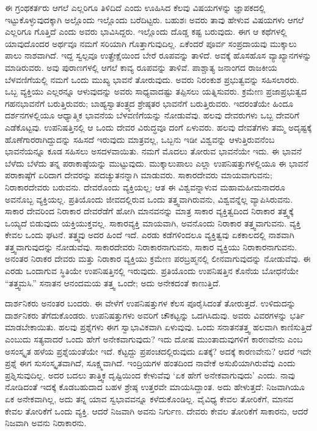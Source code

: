 \vskip 0.2cm 

ಈ ಗ್ರಂಥಕರ್ತರು ಆಗಲೆ ಎಲ್ಲರಿಗೂ ತಿಳಿದಿದೆ ಎಂದು ಊಹಿಸಿದ ಕೆಲವು ವಿಷಯಗಳನ್ನು ಜ್ಞಾಪಕದಲ್ಲಿ ಇಟ್ಟುಕೊಳ್ಳುವುದಕ್ಕಾಗಿ ಅಲ್ಲೊಂದು ಇಲ್ಲೊಂದು ಬರೆದಿಟ್ಟರು. ಬಹುಶಃ ಅವರು ತಾವು ಹೇಳುವ ವಿಷಯಗಳು ಆಗಲೆ ಎಲ್ಲರಿಗೂ ಗೊತ್ತಿದೆ ಎಂದು ಅವರು ಭಾವಿಸಿದ್ದರು. ಇಲ್ಲೊಂದು ದೊಡ್ಡ ಕಷ್ಟ ಬರುವುದು. ಈಗ ಆ ಕಥೆಗಳಲ್ಲಿ ಯಾವುದೊಂದರ ಅರ್ಥವೂ ನಮಗೆ ಸರಿಯಾಗಿ ಗೊತ್ತಾಗುವುದಿಲ್ಲ. ಏಕೆಂದರೆ ಪೂರ್ವ ಸಂಪ್ರದಾಯವು ಮುಕ್ಕಾಲು ಪಾಲು ನಾಶವಾಗಿದೆ. ಇದ್ದ ಸ್ವಲ್ಪವೂ ಉತ್ಪ್ರೇಕ್ಷೆಯಿಂದ ಬೇರೆ ರೂಪವನ್ನು ತಾಳಿದೆ. ಅವಕ್ಕೆ ಹೊಸಹೊಸ ವ್ಯಾಖ್ಯಾನಗಳನ್ನು ಮಾಡಿರುವರು. ಅವು ಪುರಾಣಗಳಲ್ಲಿ ಆಗಲೆ ಕಾವ್ಯ ರೂಪವನ್ನು ತಾಳಿವೆ. ಪಾಶ್ಚಾತ್ಯ ಜನಾಂಗದ ರಾಜಕೀಯ ಬೆಳವಣಿಗೆಯಲ್ಲಿ ನಮಗೆ ಒಂದು ಮುಖ್ಯ ಭಾವನೆ ತೋರುವುದು. ಅವರು ನಿರಂಕುಶ ಪ್ರಭುತ್ವವನ್ನು ಸಹಿಸಲಾರರು. ಒಬ್ಬ ವ್ಯಕ್ತಿಯು ಎಲ್ಲರನ್ನೂ ಆಳುವುದನ್ನು ಅವರು ಸಾಧ್ಯವಾದಷ್ಟು ತಪ್ಪಿಸಲು ಯತ್ನಿಸುವರು. ಕ್ರಮೇಣ ಪ್ರಜಾಪ್ರಭುತ್ವದ ಗಹನಭಾವನೆಗೆ ಬರುತ್ತಿರುವರು; ಬಾಹ್ಯಸ್ವಾತಂತ್ರ್ಯದ ಶ್ರೇಷ್ಠತರ ಭಾವನೆಗೆ ಬರುತ್ತಿರುವರು. ಇದರಂತೆಯೇ ಹಿಂದೂ ದರ್ಶನಗಳಲ್ಲಿಯೂ ಆಧ್ಯಾತ್ಮಿಕ ಭಾವನೆಯ ಬೆಳವಣಿಗೆಯನ್ನು ನೋಡುವೆವು. ಹಲವು ದೇವರುಗಳು ಒಬ್ಬ ದೇವರಿಗೆ ಎಡೆಕೊಟ್ಟವು. ಉಪನಿಷತ್ತಿನಲ್ಲಿ ಆ ಒಂದು ದೇವರ ವಿರುದ್ಧವೂ ದಂಗೆ ಏಳುವರು. ಹಲವು ದೇವತೆಗಳು ತಮ್ಮ ಅದೃಷ್ಟಕ್ಕೆ ಹೊಣೆಗಾರರಾಗಿದ್ದುದನ್ನು ಸಹಿಸದೆ ಇರುವುದು ಮಾತ್ರವಲ್ಲ, ಒಬ್ಬನು ಇಡೀ ವಿಶ್ವವನ್ನು ಆಳುತ್ತಿರುವನೆಂಬ ಭಾವನೆಯನ್ನೂ ಕೂಡ ಸಹಿಸಲು ಅಸದಳವಾಯಿತು. ನಮಗೆ ಮೊದಲು ತೋರುವ ಭಾವನೆಯೇ ಇದು. ಈ ಭಾವನೆ ಬೆಳೆದು ಬೆಳೆದು ತನ್ನ ಪರಾಕಾಷ್ಠೆಯನ್ನು ಮುಟ್ಟುವುದು. ಮುಕ್ಕಾಲುಪಾಲು ಎಲ್ಲಾ ಉಪನಿಷತ್ತುಗಳಲ್ಲಿಯೂ ಈ ಭಾವನೆ ಪರಾಕಾಷ್ಠೆಗೆ ಏರಿದಾಗ ದೇವರನ್ನು ಪದಚ್ಯುತನನ್ನಾಗಿ ಮಾಡುವರು. ಸಾಕಾರದೇವರು ಮಾಯವಾಗುವನು; ನಿರಾಕಾರದೇವರು ಬರುವನು. ದೇವರೊಂದು ವ್ಯಕ್ತಿಯಲ್ಲ; ಆತ ಈ ವಿಶ್ವವನ್ನಾಳುವ ಮಹಾಮಹೀಮನಾದರೂ ಅವನೊಬ್ಬ ವ್ಯಕ್ತಿಯಲ್ಲ. ಪ್ರತಿಯೊಂದು ಜೀವದಲ್ಲಿರುವ ಒಂದು ತತ್ತ್ವವಾಗಿರುವನು, ವಿಶ್ವವನ್ನೆಲ್ಲ ವ್ಯಾಪಿಸಿರುವನು. ಸಾಕಾರ ದೇವರಿಂದ ನಿರಾಕಾರ ದೇವರೆಡೆಗೆ ಹೋಗಿ ಮಾನವನನ್ನು ಮಾತ್ರ ಸಾಕಾರ ವ್ಯಕ್ತಿತ್ವದಿಂದ ನಿರಾಕಾರ ತತ್ತ್ವಕ್ಕೆ ಒಯ್ಯದೆ ಬಿಡುವುದು ಯಕ್ತಿಯುಕ್ತವಲ್ಲ. ಸಾಕಾರವ್ಯಕ್ತಿ ಮಾಯವಾಗಿ, ಅವನೊಂದು ನಿರಾಕಾರ ತತ್ತ್ವವಾಗುವನು. ವ್ಯಕ್ತಿ ಕೇವಲ ಒಂದು ಘಟನೆ. ತತ್ತ್ವವು ಅದರ ಹಿಂದೆ ಇದೆ. ಎರಡು ಕಡೆಗಳಿಂದಲೂ ವ್ಯಕ್ತಿತ್ವವು ಏಕಕಾಲದಲ್ಲಿ ನಾಶವಾಗಿ ತತ್ತ್ವವಾಗುವುದನ್ನು ನೋಡುವೆವು. ಸಾಕಾರದೇವರು ನಿರಾಕಾರನಾಗುವನು, ಸಾಕಾರ ವ್ಯಕ್ತಿಯು ನಿರಾಕಾರನಾಗುವನು. ಅನಂತರ ನಿರಾಕರ ದೇವರು ಮತ್ತು ನಿರಾಕಾರ ವ್ಯಕ್ತಿಯು ಕ್ರಮೇಣ ಪರಬ್ರಹ್ಮನಲ್ಲಿ ಲೀನವಾಗುವುದನ್ನು ನೋಡುವೆವು. ಈ ಎರಡು ಒಂದಾಗುವ ಸ್ಥಿತಿಯೇ ಉಪನಿಷತ್ತಿನಲ್ಲಿ ಇರುವುದು. ಪ್ರತಿಯೊಂದು ಉಪನಿಷತ್ತಿನ ಕೊನೆಯ ಬೋಧನೆಯೇ “ತತ್ತ್ವಮಸಿ.” ಸನಾತನ ಆನಂದಮಯ ತತ್ತ್ವ ಒಂದೇ; ಅದು ಅನೇಕದಂತೆ ಕಾಣುತ್ತಿದೆ.

\vskip 0.2cm 

ದಾರ್ಶನಿಕರು ಅನಂತರ ಬಂದರು. ಈ ವೇಳೆಗೆ ಉಪನಿಷತ್ತುಗಳ ಕೆಲಸ ಪೂರೈಸಿದಂತೆ ತೋರುತ್ತದೆ. ಉಳಿದುದನ್ನು ದಾರ್ಶನಿಕರು ತೆಗೆದುಕೊಂಡರು. ಉಪನಿಷತ್ತುಗಳು ಅವರಿಗೆ ಚೌಕಟ್ಟನ್ನು ಒದಗಿಸಿದುವು. ಅವರು ವಿವರಗಳನ್ನು ಭರ್ತಿ ಮಾಡಬೇಕಾಯಿತು. ಹಲವು ಪ್ರಶ್ನೆಗಳು ಈಗ ಸ್ವಾಭಾವಿಕವಾಗಿ ಏಳುವುವು. ಒಂದು ಸನಾತನತತ್ತ್ವ ಹಲವಾಗಿ ಕಾಣಿಸುತ್ತಿದೆ ಎಂಬುದು ಸತ್ಯವಾದರೆ ಒಂದು ಹೇಗೆ ಅನೇಕವಾಗುವುದು? ಇದು ದೋಷ ಮುಂತಾದುವುಗಳಿಗೆ ಕಾರಣವೇನು ಎಂಬ ಅಸಂಸ್ಕೃತ ಹಳೆಯ ಪ್ರಶ್ನೆಯಂತೆಯೇ ಇದೆ. ಕೆಟ್ಟದ್ದು ಪ್ರಪಂಚದಲ್ಲಿರುವುದು ಏತಕ್ಕೆ? ಅದಕ್ಕೆ ಕಾರಣವೇನು? ಆದರೆ ಇದೇ ಪ್ರಶ್ನೆ ಈಗ ಸುಸಂಸ್ಕೃತವಾಗಿದೆ, ಸೂಕ್ಷ್ಮವಾಗಿದೆ. ಇಂದ್ರಿಯಗಳ ಹಂತದಿಂದ ನಾವೇಕೆ ಅಸುಖಿಯಾಗಿರುವೆವು ಎಂದು ಪ್ರಶ್ನಿಸುವುದಿಲ್ಲ. ಅದರ ಬದಲು ತಾತ್ತ್ವಿಕ ದೃಷ್ಟಿಯಿಂದ ಕೇಳುವೆವು ‘ಏಕ ಹೇಗೆ ಅನೇಕವಾಗುವುದು’ ಎಂದು. ನಾವು ನೋಡಿದಂತೆ ಇದಕ್ಕೆ ಕೊಡಬಹುದಾದ ಬಹಳ ಶ್ರೇಷ್ಠ ಉತ್ತರವೇ ಮಾಯಸಿದ್ದಾಂತ. ಅದು ಹೇಳುತ್ತದೆ: ನಿಜವಾಗಿಯೂ ಏಕ ಅನೇಕವಾಗಿಲ್ಲ, ಅದು ತನ್ನ ಯಾವ ಸ್ವಭಾವವನ್ನೂ ಕಳೆದುಕೊಂಡಿಲ್ಲ. ವೈವಿಧ್ಯ ಕೇವಲ ತೋರಿಕೆಗೆ, ಮಾನವ ಕೇವಲ ತೋರಿಕೆಗೆ ಒಂದು ವ್ಯಕ್ತಿ. ಆದರೆ ನಿಜವಾಗಿ ಅವನು ನಿರ್ಗುಣ. ದೇವರು ಕೇವಲ ತೋರಿಕೆಗೆ ಸಾಕಾರನು, ಆದರೆ ನಿಜವಾಗಿ ಅವನು ನಿರಾಕಾರನು.

